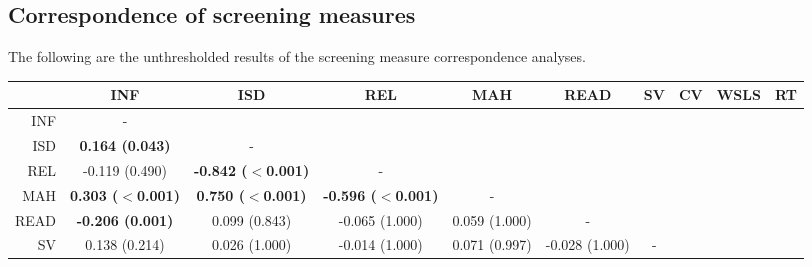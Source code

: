 \documentclass[a4paper,notitlepage,12pt]{article}
\begin{document}
\break

\subsection*{Correspondence of screening measures}

The following are the unthresholded results of the screening measure correspondence analyses.

\begin{table}[H]
    \centering
    \begin{adjustbox}{center}
    \tiny
    \begin{tabular}{rccccccccc}
        \toprule
        {} & INF &      ISD &      REL &     MAH &     READ &       SV &       CV &     WSLS & RT \\
        \midrule
        INF  &                           - &                             &                             &                            &                          &                            &                             &                             &    \\
        ISD  &      \textbf{0.164 (0.043)} &                           - &                             &                            &                          &                            &                             &                             &    \\
        REL  &              -0.119 (0.490) &  \textbf{-0.842 ($<$0.001)} &                           - &                            &                          &                            &                             &                             &    \\
        MAH  &   \textbf{0.303 ($<$0.001)} &   \textbf{0.750 ($<$0.001)} &  \textbf{-0.596 ($<$0.001)} &                          - &                          &                            &                             &                             &    \\
        READ &     \textbf{-0.206 (0.001)} &               0.099 (0.843) &              -0.065 (1.000) &              0.059 (1.000) &                        - &                            &                             &                             &    \\
        SV   &               0.138 (0.214) &               0.026 (1.000) &              -0.014 (1.000) &              0.071 (0.997) &           -0.028 (1.000) &                          - &                             &                             &    \\

\end{tabular}
\end{adjustbox}
\end{table}
\end{document}
